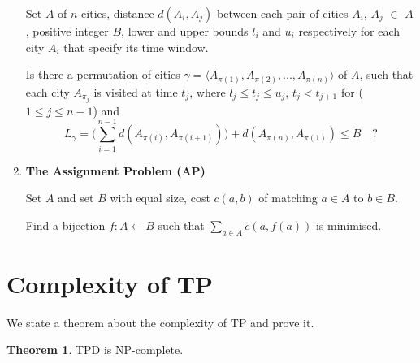 \documentclass{mprop}
\theoremstyle{definition}
\newtheorem{theorem}{Theorem}
\begin{document}
\begin{enumerate}
\begin{instance}
Set $A$ of $n$ cities, distance $d(A_{i}, A_{j})$ between each pair of cities $A_{i}$, $A_{j}$ $\in$ $A$, positive integer $B$, lower and upper bounds $l_{i}$ and $u_{i}$ respectively for each city $A_{i}$ that specify its time window.
\end{instance}

\begin{question}
Is there a permutation of cities $\gamma = \langle A_{\pi(1)}, A_{\pi(2)},...,A_{\pi(n)} \rangle$ of $A$, such that each city $A_{\pi_{j}}$ is visited at time $t_{j}$, where $l_{j} \leq t_{j} \leq u_{j}$, $t_{j} < t_{j+1}$ for ($1 \leq j \leq n-1 $) and 
$$L_{\gamma} = \bigg( \sum_{i=1}^{n-1} d(A_{\pi(i)}, A_{\pi(i+1)}) \bigg) + d(A_{\pi(n)}, A_{\pi(1)}) \leq B \quad \textrm{?}$$

\end{question}

\item \textbf{The Assignment Problem (AP)}

\begin{instance}
Set $A$ and set $B$ with equal size, cost $c(a,b)$ of matching $a \in A$ to $b \in B$.
\end{instance}

\begin{question}
Find a bijection $f: A \gets B$ such that $\sum_{a\in A} c(a,f(a))$ is minimised.
\end{question}
\end{enumerate}

\section{Complexity of TP}
We state a theorem about the complexity of TP and prove it.
\begin{theorem}
TPD is NP-complete.
\end{theorem}
\end{document}
